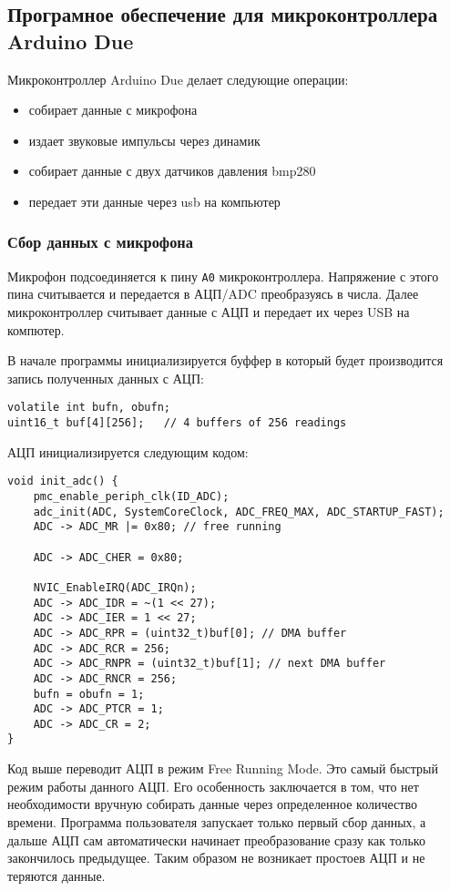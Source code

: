 \documentclass[../main.tex]{subfiles}
\begin{document}
\subsection{Програмное обеспечение для микроконтроллера Arduino Due}

Микроконтроллер Arduino Due делает следующие операции:
\begin{itemize}
    \item собирает данные с микрофона
    \item издает звуковые импульсы через динамик
    \item собирает данные с двух датчиков давления bmp280
    \item передает эти данные через usb на компьютер
\end{itemize}


\subsubsection{Сбор данных с микрофона}
Микрофон подсоединяется к пину \texttt{A0} микроконтроллера. Напряжение с этого пина считывается и передается в АЦП/ADC преобразуясь в числа. Далее микроконтроллер считывает данные с АЦП и передает их через USB на компютер.

В начале программы инициализируется буффер в который будет производится запись полученных данных с АЦП:

\begin{lstlisting}
volatile int bufn, obufn;
uint16_t buf[4][256];   // 4 buffers of 256 readings
\end{lstlisting}

АЦП инициализируется следующим кодом:

\begin{lstlisting}
void init_adc() {
    pmc_enable_periph_clk(ID_ADC);
    adc_init(ADC, SystemCoreClock, ADC_FREQ_MAX, ADC_STARTUP_FAST);
    ADC -> ADC_MR |= 0x80; // free running

    ADC -> ADC_CHER = 0x80;

    NVIC_EnableIRQ(ADC_IRQn);
    ADC -> ADC_IDR = ~(1 << 27);
    ADC -> ADC_IER = 1 << 27;
    ADC -> ADC_RPR = (uint32_t)buf[0]; // DMA buffer
    ADC -> ADC_RCR = 256;
    ADC -> ADC_RNPR = (uint32_t)buf[1]; // next DMA buffer
    ADC -> ADC_RNCR = 256;
    bufn = obufn = 1;
    ADC -> ADC_PTCR = 1;
    ADC -> ADC_CR = 2;
}
\end{lstlisting}

Код выше переводит АЦП в режим Free Running Mode. Это самый быстрый режим работы данного АЦП. Его особенность заключается в том, что нет необходимости вручную собирать данные через определенное количество времени. Программа пользователя запускает только первый сбор данных, а дальше АЦП сам автоматически начинает преобразование сразу как только закончилось предыдущее. Таким образом не возникает простоев АЦП и не теряются данные.
\end{document}
